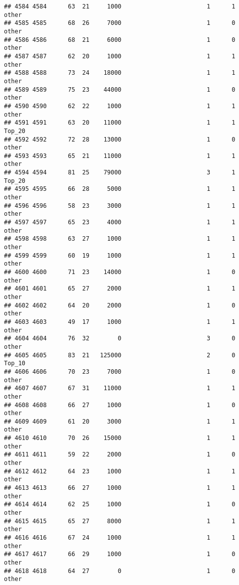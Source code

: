 \documentclass[
]{article}
\begin{document}
\begin{verbatim}
## 4584 4584      63  21     1000                        1      1    other
## 4585 4585      68  26     7000                        1      0    other
## 4586 4586      68  21     6000                        1      0    other
## 4587 4587      62  20     1000                        1      1    other
## 4588 4588      73  24    18000                        1      1    other
## 4589 4589      75  23    44000                        1      0    other
## 4590 4590      62  22     1000                        1      1    other
## 4591 4591      63  20    11000                        1      1   Top_20
## 4592 4592      72  28    13000                        1      0    other
## 4593 4593      65  21    11000                        1      1    other
## 4594 4594      81  25    79000                        3      1   Top_20
## 4595 4595      66  28     5000                        1      1    other
## 4596 4596      58  23     3000                        1      1    other
## 4597 4597      65  23     4000                        1      1    other
## 4598 4598      63  27     1000                        1      1    other
## 4599 4599      60  19     1000                        1      1    other
## 4600 4600      71  23    14000                        1      0    other
## 4601 4601      65  27     2000                        1      1    other
## 4602 4602      64  20     2000                        1      0    other
## 4603 4603      49  17     1000                        1      1    other
## 4604 4604      76  32        0                        3      0    other
## 4605 4605      83  21   125000                        2      0   Top_10
## 4606 4606      70  23     7000                        1      0    other
## 4607 4607      67  31    11000                        1      1    other
## 4608 4608      66  27     1000                        1      0    other
## 4609 4609      61  20     3000                        1      1    other
## 4610 4610      70  26    15000                        1      1    other
## 4611 4611      59  22     2000                        1      0    other
## 4612 4612      64  23     1000                        1      1    other
## 4613 4613      66  27     1000                        1      1    other
## 4614 4614      62  25     1000                        1      0    other
## 4615 4615      65  27     8000                        1      1    other
## 4616 4616      67  24     1000                        1      1    other
## 4617 4617      66  29     1000                        1      0    other
## 4618 4618      64  27        0                        1      0    other

\end{verbatim}
\end{document}
